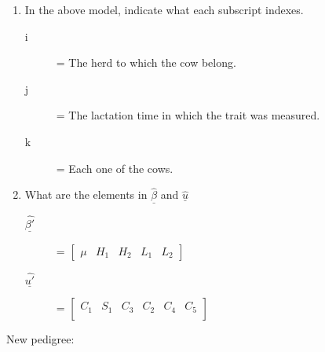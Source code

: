 \documentclass[12pt,a4paper]{paper}
\begin{document}
\begin{enumerate}
\item In the above model, indicate what each subscript indexes.
\begin{description}
\item[i] = The herd to which the cow belong.
\item[j] = The lactation time in which the trait was measured.
\item[k] = Each one of the cows.
\end{description}
\item What are the elements in $\underline{\hat{\beta}}$ and $\underline{\hat{u}}$
\begin{multicols}{2}
\begin{description}
\item[$\underline{\hat{\beta'}}$] = $\left[\begin{array}{ccccc}\mu&H_{1}&H_{2}&L_{1}&L_{2}\end{array}\right]$
\item[$\underline{\hat{u'}}$] = $\left[\begin{array}{cccccc}C_{1}&S_{1}&C_{3}&C_{2}&C_4&C_5\\\end{array}\right]$
\end{description}
\end{multicols}
\end{enumerate}
New pedigree:
\end{document}
